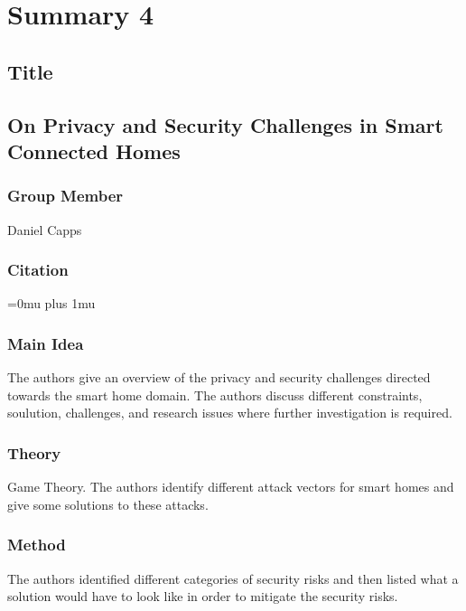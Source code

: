\section{Summary 4}

\noindent
\subsection{Title}

\subsection{{O}n {P}rivacy and {S}ecurity {C}hallenges in {S}mart {C}onnected {H}omes}

\subsubsection{Group Member}

\noindent
Daniel Capps

\noindent
\subsubsection{Citation}

\Urlmuskip=0mu plus 1mu\relax


\subsubsection{Main Idea}

\noindent
The authors give an overview of the privacy and security challenges directed towards the smart home domain. The authors discuss different constraints, soulution, challenges, and research issues where further investigation is required.

\subsubsection{Theory}

\noindent
Game Theory. The authors identify different attack vectors for smart homes and give some solutions to these attacks.

\subsubsection{Method}

\noindent
The authors identified different categories of security risks and then listed what a solution would have to look like in order to mitigate the security risks.

